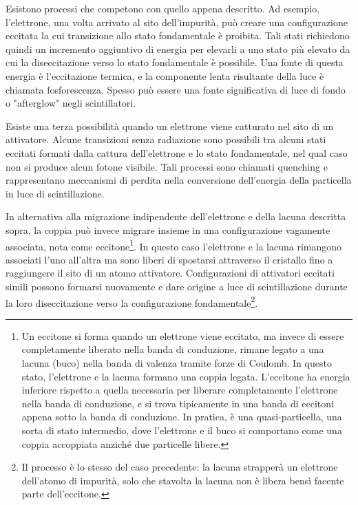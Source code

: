 Esistono processi che competono con quello appena descritto. Ad esempio, l'elettrone, una volta arrivato al sito dell'impurità, può creare una configurazione eccitata la cui transizione allo stato fondamentale è proibita. Tali stati richiedono quindi un incremento aggiuntivo di energia per elevarli a uno stato più elevato da cui la diseccitazione verso lo stato fondamentale è possibile. Una fonte di questa energia è l'eccitazione termica, e la componente lenta risultante della luce è chiamata fosforescenza. Spesso può essere una fonte significativa di luce di fondo o "afterglow" negli scintillatori.

Esiste una terza possibilità quando un elettrone viene catturato nel sito di un attivatore. Alcune transizioni senza radiazione sono possibili tra alcuni stati eccitati formati dalla cattura dell'elettrone e lo stato fondamentale, nel qual caso non si produce alcun fotone visibile. Tali processi sono chiamati quenching e rappresentano meccanismi di perdita nella conversione dell'energia della particella in luce di scintillazione.

In alternativa alla migrazione indipendente dell'elettrone e della lacuna descritta sopra, la coppia può invece migrare insieme in una configurazione vagamente associata, nota come eccitone\footnote{Un eccitone si forma quando un elettrone viene eccitato, ma invece di essere completamente liberato nella banda di conduzione, rimane legato a una lacuna (buco) nella banda di valenza tramite forze di Coulomb. In questo stato, l'elettrone e la lacuna formano una coppia legata. L'eccitone ha energia inferiore rispetto a quella necessaria per liberare completamente l'elettrone nella banda di conduzione, e si trova tipicamente in una banda di eccitoni appena sotto la banda di conduzione. In pratica, è una quasi-particella, una sorta di stato intermedio, dove l'elettrone e il buco si comportano come una coppia accoppiata anziché due particelle libere.}. In questo caso l'elettrone e la lacuna rimangono associati l'uno all'altra ma sono liberi di spostarsi attraverso il cristallo fino a raggiungere il sito di un atomo attivatore. Configurazioni di attivatori eccitati simili possono formarsi nuovamente e dare origine a luce di scintillazione durante la loro diseccitazione verso la configurazione fondamentale\footnote{Il processo è lo stesso del caso precedente: la lacuna strapperà un elettrone dell'atomo di impurità, solo che stavolta la lacuna non è libera bensì facente parte dell'eccitone.}.

